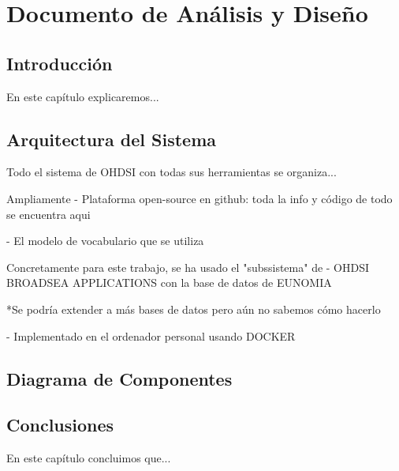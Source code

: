 \chapter{Documento de Análisis y Diseño}\label{cap:07diseño}

\section{Introducción}
En este capítulo explicaremos...

\section{Arquitectura del Sistema}

Todo el sistema de OHDSI con todas sus herramientas se organiza...

Ampliamente
- Plataforma open-source en github: toda la info y código de todo se encuentra aqui

- El modelo de vocabulario que se utiliza


Concretamente para este trabajo,
se ha usado el "subssistema" de
- OHDSI BROADSEA APPLICATIONS con la base de datos de EUNOMIA

*Se podría extender a más bases de datos pero aún no sabemos cómo hacerlo

- Implementado en el ordenador personal usando DOCKER








\section{Diagrama de Componentes}


\section{Conclusiones}
En este capítulo concluimos que...